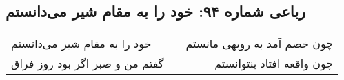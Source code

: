 \begin{center}
\section*{رباعی شماره ۹۴: خود را به مقام شیر می‌دانستم}
\label{sec:094}
\begin{longtable}{l p{0.5cm} r}
خود را به مقام شیر می‌دانستم
&&
چون خصم آمد به روبهی مانستم
\\
گفتم من و صبر اگر بود روز فراق
&&
چون واقعه افتاد بنتوانستم
\\
\end{longtable}
\end{center}
